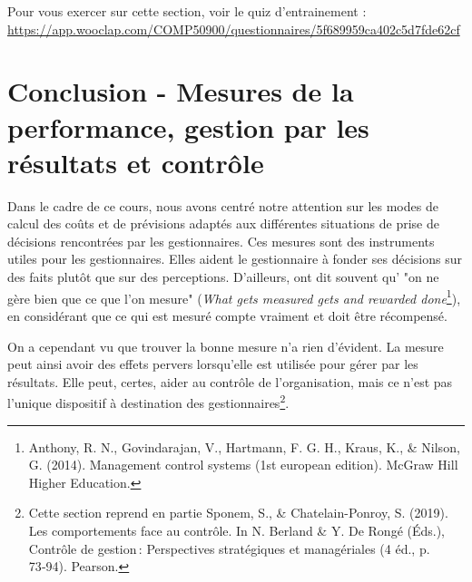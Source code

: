 \documentclass[oneside]{kaobook}
\begin{document}
\begin{kaobox}
Pour vous exercer sur cette section, voir le quiz d'entrainement : \url{https://app.wooclap.com/COMP50900/questionnaires/5f689959ca402c5d7fde62cf}
\end{kaobox}

\chapter{Conclusion - Mesures de la performance, gestion par les résultats et contrôle}
\label{sec:orgc8f030b}
Dans le cadre de ce cours, nous avons centré notre attention sur les modes de calcul des coûts et de prévisions adaptés aux différentes situations de prise de décisions rencontrées par les gestionnaires. Ces mesures sont des instruments utiles pour les gestionnaires. Elles aident le gestionnaire à fonder ses décisions sur des faits plutôt que sur des perceptions. D'ailleurs, ont dit souvent qu' "on ne gère bien que ce que l'on mesure" (\emph{What gets measured gets and rewarded done}\footnote{Anthony, R. N., Govindarajan, V., Hartmann, F. G. H., Kraus, K., \& Nilson, G. (2014). Management control systems (1st european edition). McGraw Hill Higher Education.}), en considérant que ce qui est mesuré compte vraiment et doit être récompensé. 

On a cependant vu que trouver la bonne mesure n'a rien d’évident. La mesure peut ainsi avoir des effets pervers lorsqu'elle est utilisée pour gérer par les résultats. Elle peut, certes, aider au contrôle de l'organisation, mais ce n'est pas l'unique dispositif à destination des gestionnaires\footnote{Cette section reprend en partie Sponem, S., \& Chatelain-Ponroy, S. (2019). Les comportements face au contrôle. In N. Berland \& Y. De Rongé (Éds.), Contrôle de gestion : Perspectives stratégiques et managériales (4 éd., p. 73‑94). Pearson.}.
\end{document}
